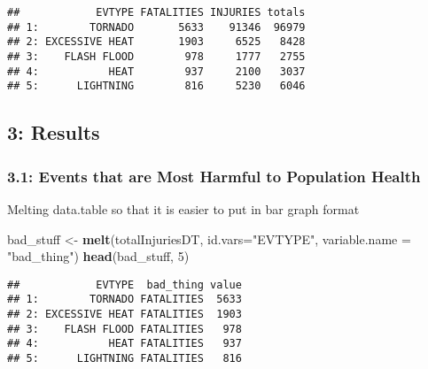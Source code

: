 \documentclass[
]{article}
\newenvironment{Shaded}{\begin{snugshade}}{\end{snugshade}}
\newcommand{\DataTypeTok}[1]{\textcolor[rgb]{0.13,0.29,0.53}{#1}}
\newcommand{\DecValTok}[1]{\textcolor[rgb]{0.00,0.00,0.81}{#1}}
\newcommand{\KeywordTok}[1]{\textcolor[rgb]{0.13,0.29,0.53}{\textbf{#1}}}
\newcommand{\NormalTok}[1]{#1}
\newcommand{\StringTok}[1]{\textcolor[rgb]{0.31,0.60,0.02}{#1}}
\begin{document}
\begin{verbatim}
##            EVTYPE FATALITIES INJURIES totals
## 1:        TORNADO       5633    91346  96979
## 2: EXCESSIVE HEAT       1903     6525   8428
## 3:    FLASH FLOOD        978     1777   2755
## 4:           HEAT        937     2100   3037
## 5:      LIGHTNING        816     5230   6046
\end{verbatim}

\hypertarget{results}{%
\subsection{3: Results}\label{results}}

\hypertarget{events-that-are-most-harmful-to-population-health}{%
\subsubsection{3.1: Events that are Most Harmful to Population
Health}\label{events-that-are-most-harmful-to-population-health}}

Melting data.table so that it is easier to put in bar graph format

\begin{Shaded}
\begin{Highlighting}[]
\NormalTok{bad_stuff <-}\StringTok{ }\KeywordTok{melt}\NormalTok{(totalInjuriesDT, }\DataTypeTok{id.vars=}\StringTok{"EVTYPE"}\NormalTok{, }\DataTypeTok{variable.name =} \StringTok{"bad_thing"}\NormalTok{)}
\KeywordTok{head}\NormalTok{(bad_stuff, }\DecValTok{5}\NormalTok{)}
\end{Highlighting}
\end{Shaded}

\begin{verbatim}
##            EVTYPE  bad_thing value
## 1:        TORNADO FATALITIES  5633
## 2: EXCESSIVE HEAT FATALITIES  1903
## 3:    FLASH FLOOD FATALITIES   978
## 4:           HEAT FATALITIES   937
## 5:      LIGHTNING FATALITIES   816
\end{verbatim}
\end{document}
